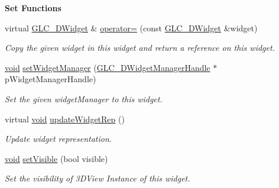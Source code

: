 \begin{Indent}{\bf Set Functions}\par
\begin{DoxyCompactItemize}
\item 
virtual \hyperlink{class_g_l_c__3_d_widget}{G\-L\-C\-\_\-D\-Widget} \& \hyperlink{class_g_l_c__3_d_widget_a4fd8ee5059250a6faf781c70d0869d02}{operator=} (const \hyperlink{class_g_l_c__3_d_widget}{G\-L\-C\-\_\-D\-Widget} \&widget)
\begin{DoxyCompactList}\small\item\em Copy the given widget in this widget and return a reference on this widget. \end{DoxyCompactList}\item 
\hyperlink{group___u_a_v_objects_plugin_ga444cf2ff3f0ecbe028adce838d373f5c}{void} \hyperlink{class_g_l_c__3_d_widget_a198e90c31fa0af5ee754c3b3fca65cc9}{set\-Widget\-Manager} (\hyperlink{class_g_l_c__3_d_widget_manager_handle}{G\-L\-C\-\_\-D\-Widget\-Manager\-Handle} $\ast$p\-Widget\-Manager\-Handle)
\begin{DoxyCompactList}\small\item\em Set the given widget\-Manager to this widget. \end{DoxyCompactList}\item 
virtual \hyperlink{group___u_a_v_objects_plugin_ga444cf2ff3f0ecbe028adce838d373f5c}{void} \hyperlink{class_g_l_c__3_d_widget_a954e9118a3c9e10db03f2db49437ecd8}{update\-Widget\-Rep} ()
\begin{DoxyCompactList}\small\item\em Update widget representation. \end{DoxyCompactList}\item 
\hyperlink{group___u_a_v_objects_plugin_ga444cf2ff3f0ecbe028adce838d373f5c}{void} \hyperlink{class_g_l_c__3_d_widget_a5bb36b85e9241edc3c2e2ced9d91639a}{set\-Visible} (bool visible)
\begin{DoxyCompactList}\small\item\em Set the visibility of 3\-D\-View Instance of this widget. \end{DoxyCompactList}\end{DoxyCompactItemize}
\end{Indent}
